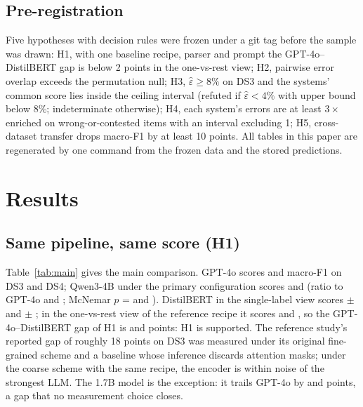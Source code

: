 \documentclass[sigconf,anonymous,review]{acmart}
\newcommand{\fone}{macro-F1\xspace}
\newcommand{\eps}{\varepsilon}
\begin{document}
\subsection{Pre-registration}
Five hypotheses with decision rules were frozen under a git tag before the sample was drawn: H1, with one baseline recipe, parser and prompt the GPT-4o--DistilBERT gap is below 2 points in the one-vs-rest view; H2, pairwise error overlap exceeds the permutation null; H3, $\hat\eps \ge 8\%$ on DS3 and the systems' common score lies inside the ceiling interval (refuted if $\hat\eps < 4\%$ with upper bound below 8\%; indeterminate otherwise); H4, each system's errors are at least $3\times$ enriched on wrong-or-contested items with an interval excluding 1; H5, cross-dataset transfer drops \fone by at least 10 points. All tables in this paper are regenerated by one command from the frozen data and the stored predictions.

\section{Results}

\begin{table}[t]
\caption{\fone of the three system families under one metric, one prompt and one parser, with 95\% paired-bootstrap intervals and Cohen's $\kappa$ against GPT-4o on the same rows. DistilBERT rows are mean $\pm$ s.d.\ over three seeds of out-of-fold predictions.}
\label{tab:main}
\centering\small

\end{table}

\subsection{Same pipeline, same score (H1)}
Table~\ref{tab:main} gives the main comparison. GPT-4o scores \gptFoneDSthree{} and \gptFoneDSfour{} \fone on DS3 and DS4; Qwen3-4B under the primary configuration scores \qFourFDSthree{} and \qFourFDSfour{} (ratio to GPT-4o \qFourRatioDSthree{} and \qFourRatioDSfour; McNemar $p$ = \qFourMcNemarDSthree{} and \qFourMcNemarDSfour). DistilBERT in the single-label view scores \dbArgDSthree{} $\pm$ \dbArgSdDSthree{} and \dbArgDSfour{} $\pm$ \dbArgSdDSfour; in the one-vs-rest view of the reference recipe it scores \dbMaskDSthree{} and \dbMaskDSfour, so the GPT-4o--DistilBERT gap of H1 is \gapDbMaskDSthree{} and \gapDbMaskDSfour{} points: H1 is supported. The reference study's reported gap of roughly 18 points on DS3 was measured under its original fine-grained scheme and a baseline whose inference discards attention masks; under the coarse scheme with the same recipe, the encoder is within noise of the strongest LLM. The 1.7B model is the exception: it trails GPT-4o by \gapQseventeenDSthree{} and \gapQseventeenDSfour{} points, a gap that no measurement choice closes.
\end{document}
